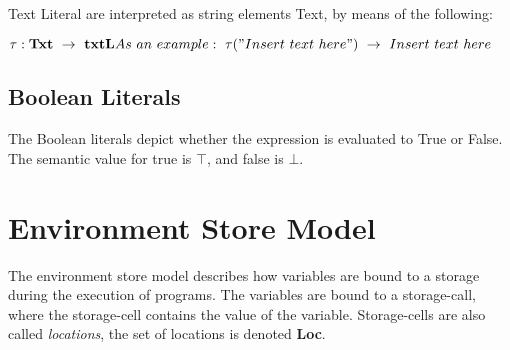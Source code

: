   
  Text Literal are interpreted as string elements Text, by means of the following:
  
  \begin{math}
  	\tau : \textbf{Txt} \ \rightarrow \ \textbf{txtL} \newline
  	As \ an \ example: \ \tau("Insert \ text \ here") \ \rightarrow \ Insert \ text \ here
  \end{math}
  
  \subsection{Boolean Literals}
  The Boolean literals depict whether the expression is evaluated to True or False. The semantic value for true is \begin{math} \top \end{math}, and false is \begin{math} \bot. \end{math}
  
  
  
  
  
  \section{Environment Store Model}
  The environment store model describes how variables are bound to a storage during the execution of programs. The variables are bound to a storage-call, where the storage-cell contains the value of the variable. Storage-cells are also called \textit{locations}, the set of locations is denoted \textbf{Loc}.
  
